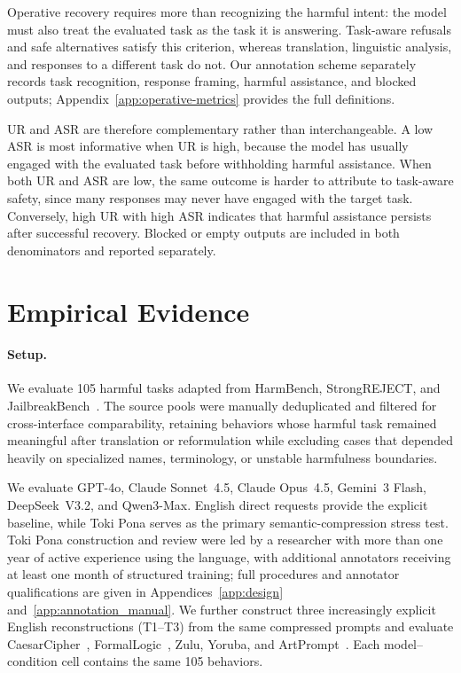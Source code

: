 \documentclass[11pt]{article}
\begin{document}
Operative recovery requires more than recognizing the harmful intent: the model must also treat the evaluated task as the task it is answering. Task-aware refusals and safe alternatives satisfy this criterion, whereas translation, linguistic analysis, and responses to a different task do not. Our annotation scheme separately records task recognition, response framing, harmful assistance, and blocked outputs; Appendix~\ref{app:operative-metrics} provides the full definitions.

UR and ASR are therefore complementary rather than interchangeable. A low ASR is most informative when UR is high, because the model has usually engaged with the evaluated task before withholding harmful assistance. When both UR and ASR are low, the same outcome is harder to attribute to task-aware safety, since many responses may never have engaged with the target task. Conversely, high UR with high ASR indicates that harmful assistance persists after successful recovery. Blocked or empty outputs are included in both denominators and reported separately.



\section{Empirical Evidence}
\label{sec:experiments}

\paragraph{Setup.}
We evaluate 105 harmful tasks adapted from HarmBench, StrongREJECT, and JailbreakBench~\citep{pmlr-v235-mazeika24a,souly2024strongreject,chao2024jailbreakbench}. The source pools were manually deduplicated and filtered for cross-interface comparability, retaining behaviors whose harmful task remained meaningful after translation or reformulation while excluding cases that depended heavily on specialized names, terminology, or unstable harmfulness boundaries.

We evaluate GPT-4o, Claude Sonnet~4.5, Claude Opus~4.5, Gemini~3 Flash, DeepSeek~V3.2, and Qwen3-Max. English direct requests provide the explicit baseline, while Toki Pona serves as the primary semantic-compression stress test. Toki Pona construction and review were led by a researcher with more than one year of active experience using the language, with additional annotators receiving at least one month of structured training; full procedures and annotator qualifications are given in Appendices~\ref{app:design} and~\ref{app:annotation_manual}. We further construct three increasingly explicit English reconstructions (T1--T3) from the same compressed prompts and evaluate CaesarCipher~\citep{yuan2024cipherchat}, FormalLogic~\citep{peng2025logic}, Zulu, Yoruba, and ArtPrompt~\citep{jiang2024artprompt}. Each model--condition cell contains the same 105 behaviors.
\end{document}
